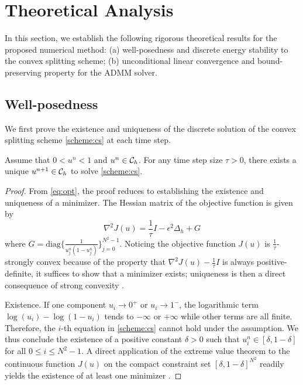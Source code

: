 \section{Theoretical Analysis}
\label{section:analysis}
In this section, we establish the following rigorous theoretical results for the proposed numerical method: 
(a) well-posedness and discrete energy stability to the convex splitting scheme; 
(b) unconditional linear convergence and bound-preserving property for the ADMM solver.
\subsection{Well-posedness}
We first prove the existence and uniqueness of the discrete solution of the convex splitting scheme 
\eqref{scheme:cs} at each time step.
\begin{theorem}\label{thm:well-posedness}
    Assume that $0<u^n<1$ and $u^n \in {\mathcal{C}_h}$. For any time step size $\tau>0$, there exists a unique $u^{n+1}\in {\mathcal{C}_h}$ to solve \eqref{scheme:cs}.
\end{theorem}
\begin{proof}
    From \eqref{eq:opt}, the proof reduces to establishing the existence and uniqueness of a minimizer. 
    The Hessian matrix of the objective function is given by
    \begin{equation}
        \nabla^2 J(u)=\frac{1}{\tau}I-\epsilon^2\Delta_h+G
    \end{equation}
    where $G=\text{diag}\{
    \frac{1}{u_j^n(1-u_j^n)}\}_{j=0}^{N^2-1}$. 
    Noticing the objective function $J(u)$ is $\frac{1}{\tau}$-strongly convex because of the property that $\nabla^2J(u)-\frac{1}{\tau}I$ is always positive-definite, 
    it suffices to show that a minimizer exists; uniqueness is then a direct consequence of strong convexity \cite{boyd2004convex}.
    \par Existence. If one component $u_i\to 0^+$ or $u_i \to 1^-$, the logarithmic term $\log(u_i)-\log(1-u_i)$ tends to $-\infty$ or $+\infty$ while other terms are all finite. 
    Therefore, the $i$-th equation in \eqref{scheme:cs} cannot hold under the assumption. 
    We thus conclude the existence of a positive constant $\delta>0$ such that $u_i^n\in[\delta,1-\delta]$ for all $0\leq i\leq N^2-1$. 
    A direct application of the extreme value theorem to the continuous function $J(u)$ on the compact constraint set $[\delta,1-\delta]^{N^2}$ 
    readily yields the existence of at least one minimizer \cite{1976Principles,weierstrass1894mathematische}.
\end{proof}
